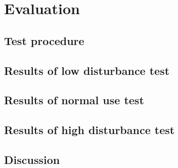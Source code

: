 \chapter{Evaluation}
\section{Test procedure}
\section{Results of low disturbance test}
\section{Results of normal use test}
\section{Results of high disturbance test}
\section{Discussion}